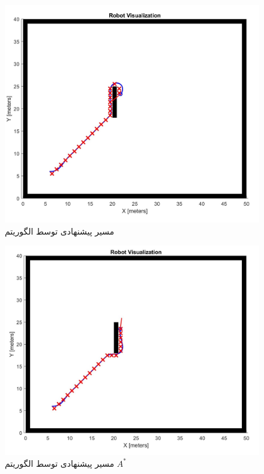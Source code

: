 \begin{figure}[!h]
	\centering
	\includegraphics[scale=0.35]{Images/Greedy path.jpg}
	\caption{مسیر پیشنهادی توسط الگوریتم }\label{Fig Greedy path}
\end{figure}

\begin{figure}[!h]
	\centering
	\includegraphics[scale=0.35]{Images/A-star path.jpg}
	\caption{مسیر پیشنهادی توسط الگوریتم $A^*$}\label{Fig A-star path}
\end{figure}

